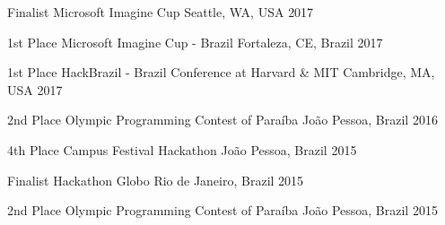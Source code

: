 



\begin{cvhonors}

  \cvhonor
    {Finalist} %
    {Microsoft Imagine Cup} %
    {Seattle, WA, USA} %
    {2017} %
    
  \cvhonor
    {1st Place} %
    {Microsoft Imagine Cup - Brazil} %
    {Fortaleza, CE, Brazil} %
    {2017} %
    
  \cvhonor
    {1st Place} %
    {HackBrazil - Brazil Conference at Harvard \& MIT} %
    {Cambridge, MA, USA} %
    {2017} %
    
  \cvhonor
    {2nd Place} %
    {Olympic Programming Contest of Paraíba} %
    {João Pessoa, Brazil} %
    {2016} %

  \cvhonor
    {4th Place} %
    {Campus Festival Hackathon} %
    {João Pessoa, Brazil} %
    {2015} %
    
  \cvhonor
    {Finalist} %
    {Hackathon Globo} %
    {Rio de Janeiro, Brazil} %
    {2015} %

  \cvhonor
    {2nd Place} %
    {Olympic Programming Contest of Paraíba} %
    {João Pessoa, Brazil} %
    {2015} %
    
\end{cvhonors}


